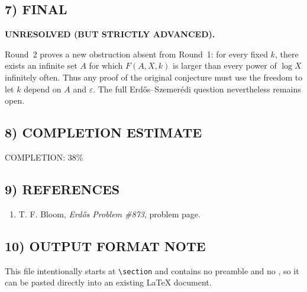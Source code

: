 \subsection*{7) FINAL}

\textbf{UNRESOLVED (BUT STRICTLY ADVANCED).}

Round~2 proves a new obstruction absent from Round~1: for every fixed \(k\), there exists an infinite set \(A\) for which \(F(A,X,k)\) is larger than every power of \(\log X\) infinitely often. Thus any proof of the original conjecture must use the freedom to let \(k\) depend on \(A\) and \(\varepsilon\). The full Erd\H{o}s--Szemer\'edi question nevertheless remains open.

\subsection*{8) COMPLETION ESTIMATE}

COMPLETION: 38\%

\subsection*{9) REFERENCES}

\begin{enumerate}
\item T. F. Bloom, \emph{Erd\H{o}s Problem \#873}, problem page.
\end{enumerate}

\subsection*{10) OUTPUT FORMAT NOTE}

This file intentionally starts at \verb|\section| and contains no preamble and no \verb||, so it can be pasted directly into an existing LaTeX document.

